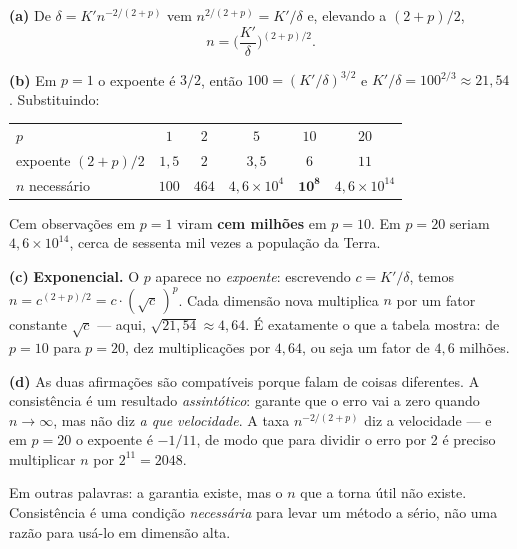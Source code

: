 \documentclass[11pt,a4paper]{article}
\begin{document}
\begin{solucao}
\textbf{(a)} De $\delta=K'n^{-2/(2+p)}$ vem $n^{2/(2+p)}=K'/\delta$ e, elevando
a $(2+p)/2$,
\[
  n = \Big(\frac{K'}{\delta}\Big)^{(2+p)/2}.
\]

\smallskip
\textbf{(b)} Em $p=1$ o expoente é $3/2$, então
$100=(K'/\delta)^{3/2}$ e $K'/\delta=100^{2/3}\approx 21{,}54$. Substituindo:
\begin{center}\small
\renewcommand{\arraystretch}{1.3}
\begin{tabular}{@{}lccccc@{}}
\toprule
$p$ & $1$ & $2$ & $5$ & $10$ & $20$ \\
expoente $(2+p)/2$ & $1{,}5$ & $2$ & $3{,}5$ & $6$ & $11$ \\
\midrule
$n$ necessário & $100$ & $464$ & $4{,}6\times10^{4}$ & $\mathbf{10^{8}}$ & $4{,}6\times10^{14}$ \\
\bottomrule
\end{tabular}
\end{center}
Cem observações em $p=1$ viram \textbf{cem milhões} em $p=10$. Em $p=20$ seriam
$4{,}6\times10^{14}$, cerca de sessenta mil vezes a população da Terra.

\smallskip
\textbf{(c)} \textbf{Exponencial.} O $p$ aparece no \emph{expoente}: escrevendo
$c=K'/\delta$, temos $n=c^{(2+p)/2}=c\cdot(\sqrt{c}\,)^{p}$. Cada dimensão nova
multiplica $n$ por um fator constante $\sqrt{c}$ --- aqui, $\sqrt{21{,}54}\approx
4{,}64$. É exatamente o que a tabela mostra: de $p=10$ para $p=20$, dez
multiplicações por $4{,}64$, ou seja um fator de $4{,}6$ milhões.

\smallskip
\textbf{(d)} As duas afirmações são compatíveis porque falam de coisas
diferentes. A consistência é um resultado \emph{assintótico}: garante que o erro
vai a zero quando $n\to\infty$, mas não diz \emph{a que velocidade}. A taxa
$n^{-2/(2+p)}$ diz a velocidade --- e em $p=20$ o expoente é $-1/11$, de modo que
para dividir o erro por 2 é preciso multiplicar $n$ por $2^{11}=2048$.

Em outras palavras: a garantia existe, mas o $n$ que a torna útil não existe.
Consistência é uma condição \emph{necessária} para levar um método a sério, não
uma razão para usá-lo em dimensão alta.
\end{solucao}
\end{document}
